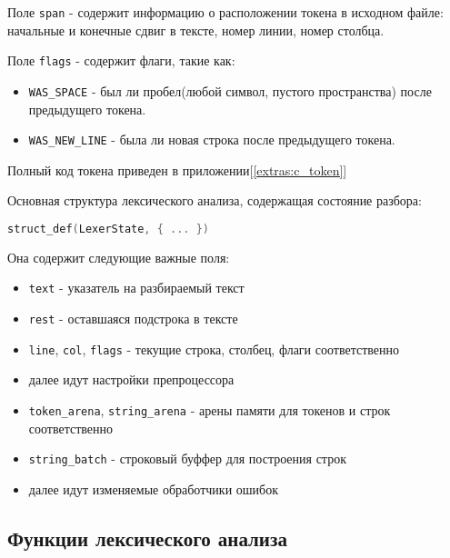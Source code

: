 Поле \verb|span| - содержит информацию о расположении токена в исходном файле: начальные и конечные сдвиг в тексте, номер линии, номер столбца.

Поле \verb|flags| - содержит флаги, такие как:
\begin{itemize}
    \item \verb|WAS_SPACE| - был ли пробел(любой символ, пустого пространства) после предыдущего токена.
    \item \verb|WAS_NEW_LINE| - была ли новая строка после предыдущего токена.
\end{itemize}

Полный код токена приведен в приложении[\ref{extras:c_token}]


Основная структура лексического анализа, содержащая состояние разбора:
\begin{lstlisting}[language=c]
struct_def(LexerState, { ... })
\end{lstlisting}

Она содержит следующие важные поля:
\begin{itemize}
  \item \verb|text| - указатель на разбираемый текст
  \item \verb|rest| - оставшаяся подстрока в тексте

  \item \verb|line|, \verb|col|, \verb|flags| - текущие строка, столбец, флаги соответственно
  \item далее идут настройки препроцессора
  
  \item \verb|token_arena|, \verb|string_arena| - арены памяти для токенов и строк соответственно
  \item \verb|string_batch| - строковый буффер для построения строк

  \item далее идут изменяемые обработчики ошибок
\end{itemize}

\subsection{Функции лексического анализа}
\label{lexing:fns}

